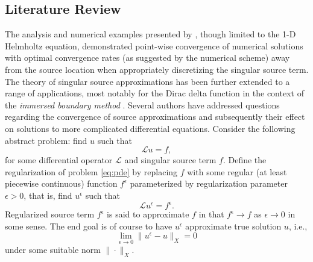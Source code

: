 


\subsection{Literature Review} %

The analysis and numerical examples presented by \cite{Walden:1999}, though limited to the 1-D Helmholtz equation, demonstrated point-wise convergence of numerical solutions with optimal convergence rates (as suggested by the numerical scheme) away from the source location when appropriately discretizing the singular source term.
The theory of singular source approximations has been further extended to a range of applications, most notably for the Dirac delta function in the context of the {\em immersed boundary method} \citep{Pes:02}. 
Several authors have addressed questions regarding the convergence of source approximations and subsequently their effect on solutions to more complicated differential equations.
Consider the following abstract problem: find $u$ such that
\begin{equation}\label{eq:pde}
	\mathcal L u = f,
\end{equation}
for some differential operator $\mathcal L$ and singular source term $f$.
Define the regularization of problem \ref{eq:pde} by replacing $f$ with some regular (at least piecewise continuous) function $f^\epsilon$ parameterized by regularization parameter $\epsilon>0$, that is, find $u^\epsilon$ such that
\begin{equation}\label{eq:pde_reg}
	\mathcal L u^\epsilon = f^{\epsilon}.
\end{equation}
Regularized source term $f^\epsilon$ is said to approximate $f$ in that $f^\epsilon \to f$ as $\epsilon \to 0$ in some sense.
The end goal is of course to have $u^\epsilon$ approximate true solution $u$, i.e.,
\[
	\lim_{\epsilon\to 0}\|u^\epsilon-u\|_X = 0
\]
under some suitable norm $\|\cdot\|_X$.

